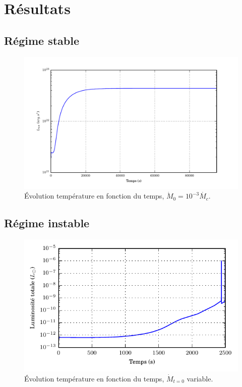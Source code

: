 \documentclass[french]{beamer}
\begin{document}
\section{Résultats}
\subsection{Régime stable}

\begin{frame}
  \begin{figure}
\includegraphics[width=\columnwidth]{figures/Ltot_fonction_t_stable.pdf}
    \caption{Évolution température en fonction du temps, $\dot{M}_0 = 10^{-3}\dot{M_c}$.}
  \end{figure}
\end{frame}

\subsection{Régime instable}

\begin{frame}
  \begin{figure}
    \includegraphics[width=.9\columnwidth]{figures/Ltot_fonction_t.pdf}
    \caption{Évolution température en fonction du temps, $\dot{M}_{t=0}$ variable.}
  \end{figure}  
\end{frame}
\end{document}
